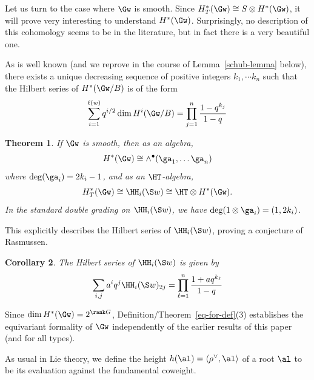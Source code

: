 \documentclass[12pt]{wart}
\newtheorem{thm}{Theorem}[section]
\newtheorem{cor}[thm]{Corollary}
\theoremstyle{remark}
\begin{document}
Let us turn to the case where $\Gw$ is smooth. Since $H^*_T(\Gw)\cong S\otimes H^*(\Gw)$, it will prove very interesting to understand $H^*(\Gw)$.  Surprisingly, no description of this cohomology seems to be in the literature, but in fact there is a very beautiful one.

As is well known (and we reprove in the course of
Lemma~\ref{schub-lemma} below), there exists a unique decreasing
sequence of positive integers $k_1,\cdots k_{n}$ such that the Hilbert series
of $H^*(\Gw/B)$ is of the form
\begin{equation*}
  \sum_{i=1}^{\ell(w)}q^{i/2}\dim H^i(\Gw/B)=\prod_{j=1}^n\frac{1-q^{k_j}}{1-q}
\end{equation*}

\begin{thm}\label{equiv-form}
  If $\Gw$ is smooth, %
  then as an algebra,
  \begin{equation}\label{eq:1}
    H^*(\Gw)\cong \land^{\bullet}(\ga_1,\ldots \ga_n)
  \end{equation}
  where $\deg(\ga_i)=2k_i-1$, and as an
  $\HT$-algebra,
  \begin{equation*}
    H^*_T(\Gw)\cong\HH_i(\S w)\cong \HT\otimes H^*(\Gw).
  \end{equation*}
  In the standard double grading on $\HH_i(\S w)$, we have $\deg(1\otimes \ga_i)=(1,2k_i)$.
\end{thm}

This explicitly describes the Hilbert series of $\HH_i(\S w)$, proving
a conjecture of Rasmussen.
\begin{cor}
  The Hilbert series of $\HH_i(\S w)$ is given by
  \begin{equation*}
    \sum_{i,j}a^iq^j \HH_i(\S w)_{2j}=\prod_{\ell=1}^{n}\frac{1+aq^{k_\ell}}{1-q}
  \end{equation*}
\end{cor}
Since $\dim H^*(\Gw)=2^{\rank G}$, Definition/Theorem~\ref{eq-for-def}(3) establishes the equivariant formality of $\Gw$ independently of the earlier results of this paper (and for all types).  

As usual in Lie theory, we define the height $h(\al)=\langle\rho^\vee, \al\rangle$ of a root $\al$ to be its evaluation against the fundamental coweight.
\end{document}
